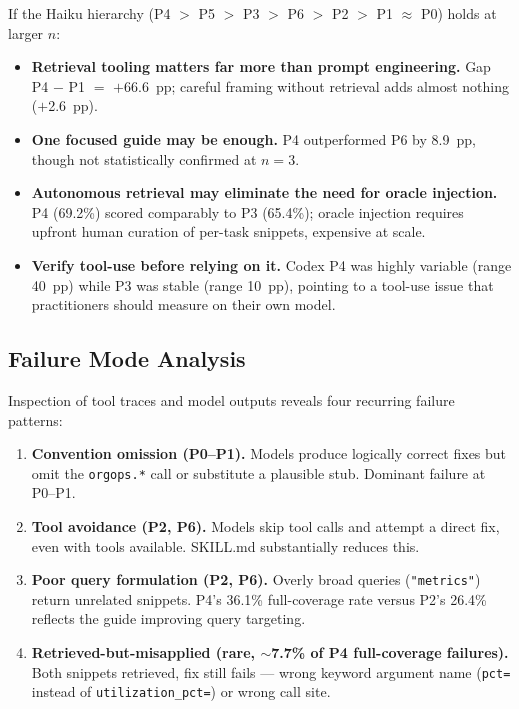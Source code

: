\documentclass[10pt,conference]{IEEEtran}
\begin{document}
If the Haiku hierarchy (P4 $>$ P5 $>$ P3 $>$ P6 $>$ P2 $>$ P1 $\approx$ P0) holds at larger $n$:

\begin{itemize}
    \item \textbf{Retrieval tooling matters far more than prompt engineering.} Gap P4 $-$ P1 $=$ $+$66.6~pp; careful framing without retrieval adds almost nothing ($+$2.6~pp).
    \item \textbf{One focused guide may be enough.} P4 outperformed P6 by 8.9~pp, though not statistically confirmed at $n{=}3$.
    \item \textbf{Autonomous retrieval may eliminate the need for oracle injection.} P4 (69.2\%) scored comparably to P3 (65.4\%); oracle injection requires upfront human curation of per-task snippets, expensive at scale.
    \item \textbf{Verify tool-use before relying on it.} Codex P4 was highly variable (range 40~pp) while P3 was stable (range 10~pp), pointing to a tool-use issue that practitioners should measure on their own model.
\end{itemize}

\subsection{Failure Mode Analysis}
\label{sec:qualitative}

Inspection of tool traces and model outputs reveals four recurring failure patterns:

\begin{enumerate}
    \item \textbf{Convention omission (P0--P1).} Models produce logically correct fixes but omit the \texttt{orgops.*} call or substitute a plausible stub. Dominant failure at P0--P1.
    \item \textbf{Tool avoidance (P2, P6).} Models skip tool calls and attempt a direct fix, even with tools available. SKILL.md substantially reduces this.
    \item \textbf{Poor query formulation (P2, P6).} Overly broad queries (\texttt{"metrics"}) return unrelated snippets. P4's 36.1\% full-coverage rate versus P2's 26.4\% reflects the guide improving query targeting.
    \item \textbf{Retrieved-but-misapplied (rare, $\sim$7.7\% of P4 full-coverage failures).} Both snippets retrieved, fix still fails --- wrong keyword argument name (\texttt{pct=} instead of \texttt{utilization\_pct=}) or wrong call site.
\end{enumerate}
\end{document}
